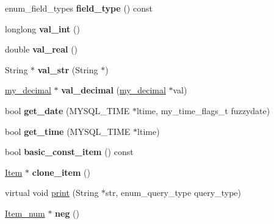 \begin{DoxyCompactItemize}
enum\+\_\+field\+\_\+types {\bfseries field\+\_\+type} () const
\item 
\mbox{\label{classItem__decimal_ac6c700bba025b02310fe2ff738114fc8}} 
longlong {\bfseries val\+\_\+int} ()
\item 
\mbox{\label{classItem__decimal_ad6943a4128a52430153695e0b4dc759c}} 
double {\bfseries val\+\_\+real} ()
\item 
\mbox{\label{classItem__decimal_a6ae8da2a6f0b8aa8bdda36a72c920960}} 
String $\ast$ {\bfseries val\+\_\+str} (String $\ast$)
\item 
\mbox{\label{classItem__decimal_aaaf272f114a0de4b306e733acc44cf3f}} 
\mbox{\hyperlink{classmy__decimal}{my\+\_\+decimal}} $\ast$ {\bfseries val\+\_\+decimal} (\mbox{\hyperlink{classmy__decimal}{my\+\_\+decimal}} $\ast$val)
\item 
\mbox{\label{classItem__decimal_a7e34379690e3fe0ea144d05d6c74eb3e}} 
bool {\bfseries get\+\_\+date} (M\+Y\+S\+Q\+L\+\_\+\+T\+I\+ME $\ast$ltime, my\+\_\+time\+\_\+flags\+\_\+t fuzzydate)
\item 
\mbox{\label{classItem__decimal_aad5a8e980b226afafd63e71846057572}} 
bool {\bfseries get\+\_\+time} (M\+Y\+S\+Q\+L\+\_\+\+T\+I\+ME $\ast$ltime)
\item 
\mbox{\label{classItem__decimal_a2f48a8af92cf5196ffe077cda6ccaa87}} 
bool {\bfseries basic\+\_\+const\+\_\+item} () const
\item 
\mbox{\label{classItem__decimal_aeeb1df223c089a8249302d77ea7f1296}} 
\mbox{\hyperlink{classItem}{Item}} $\ast$ {\bfseries clone\+\_\+item} ()
\item 
virtual void \mbox{\hyperlink{classItem__decimal_aa6e14a49a63e7eab8ee478bf4372926d}{print}} (String $\ast$str, enum\+\_\+query\+\_\+type query\+\_\+type)
\item 
\mbox{\label{classItem__decimal_a5f5b1edaa0ded91ab8c992e7582d16da}} 
\mbox{\hyperlink{classItem__num}{Item\+\_\+num}} $\ast$ {\bfseries neg} ()
\item 

\end{DoxyCompactItemize}
